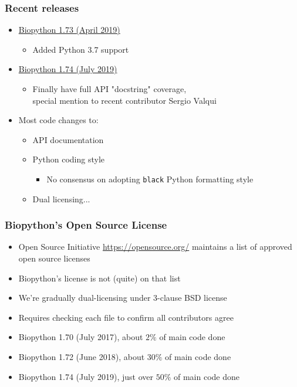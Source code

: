 \begin{frame}
\frametitle{Recent releases}
\begin{itemize}
\item \href{https://www.open-bio.org/2018/12/18/biopython-1-73-released/}{Biopython 1.73 (April 2019)}
  \begin{itemize}
  \item Added Python 3.7 support
  \end{itemize}
\item \href{https://www.open-bio.org/2019/07/16/biopython-1-74-released/}{Biopython 1.74 (July 2019)}
  \begin{itemize}
  \item Finally have full API "docstring" coverage, \\
        special mention to recent contributor Sergio Valqui
  \end{itemize}
\item Most code changes to:
  \begin{itemize}
  \item API documentation
  \item Python coding style
    \begin{itemize}
    \item No consensus on adopting \texttt{black} Python formatting style
    \end{itemize}
  \item Dual licensing...
  \end{itemize}
\end{itemize}
\end{frame}


\begin{frame}
\frametitle{Biopython's Open Source License}
\begin{itemize}
\item Open Source Initiative \url{https://opensource.org/}
    maintains a list of approved open source licenses
\item Biopython's license is not (quite) on that list
\item We're gradually dual-licensing under 3-clause BSD license
\item Requires checking each file to confirm all contributors agree
\item Biopython 1.70 (July 2017), about $2\%$ of main code done
\item Biopython 1.72 (June 2018), about $30\%$ of main code done
\item Biopython 1.74 (July 2019), just over $50\%$ of main code done
\end{itemize}
\end{frame}


